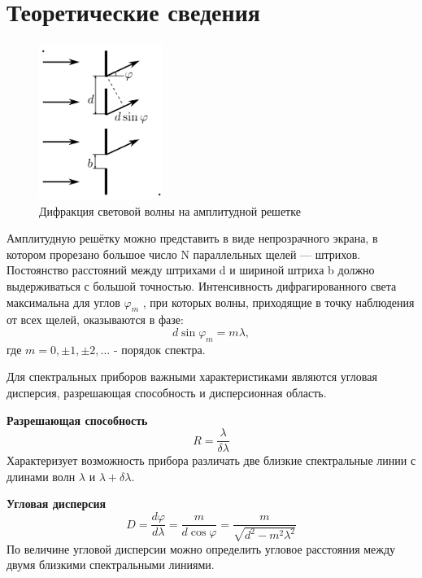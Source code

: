 \section*{Теоретические сведения}
\begin{figure}
    \centering
    \includegraphics[width=4cm]{images/difrationnaya_reshetka.png}
    \caption{Дифракция световой волны на амплитудной решетке}
\end{figure}
\indent Амплитудную решётку можно представить в виде непрозрачного экрана, в котором прорезано большое число N параллельных щелей — штрихов. Постоянство 
расстояний между штрихами d и шириной штриха b должно выдерживаться с большой точностью.
\indent Интенсивность дифрагированного света максимальна для углов $\varphi_m$ , при которых волны, приходящие в точку наблюдения от всех щелей, оказываются в
фазе:
\begin{equation}
    d\sin\varphi_m = m\lambda \label{eq:main_difraction}, 
\end{equation}
где $m = 0, \pm 1, \pm 2, \dots$ - порядок спектра.

\indent
Для спектральных приборов важными характеристиками являются
угловая дисперсия, разрешающая способность и дисперсионная область.

\textbf{Разрешающая способность}\\
\begin{equation}
    R = \frac{\lambda}{\delta \lambda} \label{eq:spectr_1}
\end{equation}
\indent Характеризует возможность прибора различать две близкие спектральные линии с длинами волн $\lambda$ и $\lambda + \delta \lambda$.

\textbf{Угловая дисперсия}\\
\begin{equation}
    D = \frac{d\varphi}{d\lambda} = \frac{m}{d\cos\varphi} = \frac{m}{\sqrt{d^2 - m^2{\lambda}^2}} \label{eq:spectr_2}
\end{equation}
\indent По величине угловой дисперсии можно определить угловое расстояния между двумя близкими спектральными линиями.

